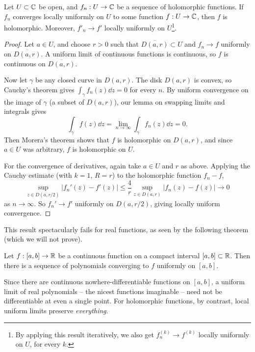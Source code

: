 \documentclass[a4paper]{scrartcl}
\begin{document}
\begin{theorem}
    Let $U \subset \mathbb{C}$ be open, and $f_n: U \rightarrow \mathbb{C}$ be a sequence of holomorphic functions. If $f_n$ converges locally uniformly on $U$ to some function $f: U \rightarrow \mathbb{C}$, then $f$ is holomorphic. Moreover, $f'_n \rightarrow f'$ locally uniformly on $U$\footnote{By applying this result iteratively, we also get $f_n^{(k)} \rightarrow f^{(k)}$ locally uniformly on $U$, for every $k$.}.
\end{theorem}
\begin{proof}
    Let $a \in U$, and choose $r > 0$ such that $\overline{D(a, r)} \subset U$ and $f_n \rightarrow f$ uniformly on $\overline{D(a, r)}$. A uniform limit of continuous functions is continuous, so $f$ is continuous on $\overline{D(a, r)}$.

    Now let $\gamma$ be any closed curve in $D(a, r)$. The disk $D(a, r)$ is convex, so Cauchy's theorem gives $\int_\gamma f_n(z) \dd z = 0$ for every $n$. By uniform convergence on the image of $\gamma$ (a subset of $D(a,r)$), our lemma on swapping limits and integrals gives
    $$
    \int_\gamma f(z) \dd z = \lim_{n \to \infty} \int_\gamma f_n(z) \dd z = 0.
    $$
    Then Morera's theorem shows that $f$ is holomorphic on $D(a, r)$, and since $a \in U$ was arbitrary, $f$ is holomorphic on $U$.

    For the convergence of derivatives, again take $a \in U$ and $r$ as above. Applying the Cauchy estimate (with $k = 1$, $R = r$) to the holomorphic function $f_n - f$,
    $$
    \sup_{z \in D(a, r/2)} |f_n'(z) - f'(z)| \leq \frac{4}{r} \sup_{z \in D(a, r)} |f_n(z) - f(z)| \rightarrow 0
    $$
    as $n \rightarrow \infty$. So $f_n' \rightarrow f'$ uniformly on $D(a, r/2)$, giving locally uniform convergence.
\end{proof}

This result spectacularly fails for real functions, as seen by the following theorem (which we will not prove).

\begin{theorem}
    Let $f: [a, b] \rightarrow \mathbb{R}$ be a continuous function on a compact interval $[a, b] \subset \mathbb{R}$. Then there is a sequence of polynomials converging to $f$ uniformly on $[a, b]$.
\end{theorem}

Since there are continuous nowhere-differentiable functions on $[a, b]$, a uniform limit of real polynomials -- the nicest functions imaginable -- need not be differentiable at even a single point. For holomorphic functions, by contrast, local uniform limits preserve \emph{everything}.
\end{document}
